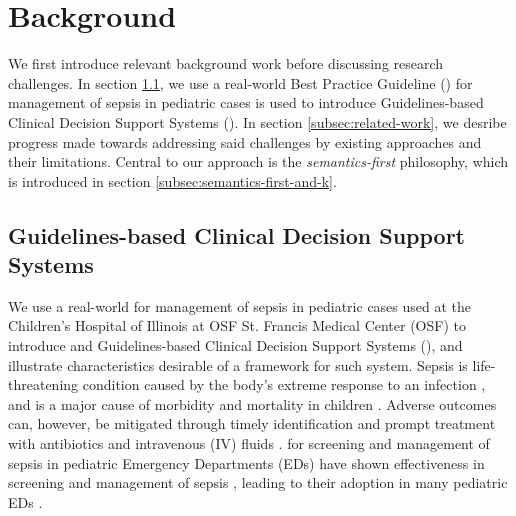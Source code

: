 \section{Background}


We first introduce relevant background work before discussing research challenges.
In section \ref{subsec:cdss}, we use a real-world Best Practice Guideline (\BPG{})
for management of sepsis
in pediatric cases is used to introduce Guidelines-based Clinical Decision
Support Systems (\CDSSs{}).
In section \ref{subsec:related-work}, we desribe progress
made towards addressing said challenges by existing approaches and their limitations.
Central to our approach is the \emph{semantics-first} philosophy,
which is introduced in section \ref{subsec:semantics-first-and-k}.

\subsection{Guidelines-based Clinical Decision Support Systems}\label{subsec:cdss}

We use a real-world \BPG{} for management of sepsis
in pediatric cases used at the Children's Hospital of Illinois at OSF St.
Francis Medical Center (OSF) to introduce \BPGs{} and Guidelines-based Clinical Decision
Support Systems (\CDSSs{}), and illustrate characteristics desirable of a framework for such system.
Sepsis is life-threatening condition caused by the body's extreme response to
an infection \cite{RhodesICM17}, and is
a major cause of morbidity and mortality in children \cite{Eisenberg2021JP}.
Adverse outcomes can, however, be mitigated through timely
identification and prompt treatment with antibiotics and
intravenous (IV) fluids \cite{Weiss2014CCM,Evans2018JAMA}.
\BPGs{} for screening and management of sepsis in pediatric Emergency
Departments (EDs) have shown effectiveness in screening and management of sepsis \cite{Eisenberg2021JP},
leading to their adoption in many pediatric EDs \cite{Balamuth2017EM,Sepanski2014FP}.

